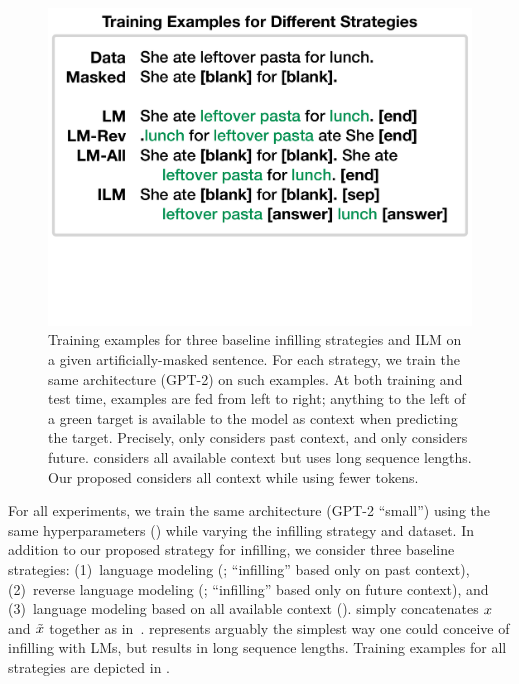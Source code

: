 \begin{figure}[t]
    \centering
    \includegraphics[width=1\linewidth]{figures/ilm_figure2_final.pdf}
    \vspace{-2cm}
    \caption{
    Training examples for three baseline infilling strategies and ILM on a given artificially-masked sentence. 
    For each strategy, we train the same architecture (GPT-2) on such examples. 
    At both training and test time, examples are fed from left to right; anything to the left of a green target is available to the model as context when predicting the target.
    Precisely, \lm{} only considers past context, and \lmrev{} only considers future. \lmall{} considers all available context but uses long sequence lengths. Our proposed \ilm{} considers all context while using fewer tokens. 
    }
    \label{fig:training_examples}
\end{figure}

For all experiments, we train the same architecture (GPT-2 ``small'') using the same hyperparameters () while varying the infilling strategy and dataset. 
In addition to our proposed \ilm{} strategy for infilling, we consider three baseline strategies:
(1)~language modeling (\lm{}; ``infilling'' based only on past context),
(2)~reverse language modeling (\lmrev{}; ``infilling'' based only on future context),
and 
(3)~language modeling based on all available context (\lmall{}).
\lmall{} simply concatenates $x$ and $\tilde{x}$ together as in~\citet{fedus2018maskgan}. 
\lmall{} represents arguably the simplest way one could conceive of infilling with LMs, 
but results in long sequence lengths.
Training examples for all strategies are depicted in .

